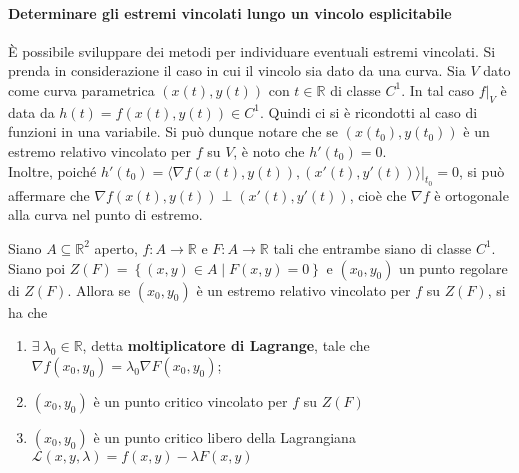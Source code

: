 \paragraph{Determinare gli estremi vincolati lungo un vincolo esplicitabile}
È possibile sviluppare dei metodi per individuare eventuali estremi vincolati. Si prenda in considerazione il caso in cui il vincolo sia dato da una curva.
Sia $V$ dato come curva parametrica $(x(t), y(t))$ con $t \in \mathbb{R}$ di classe $C^1$.
In tal caso $f \big|_V$ è data da $h(t)=f(x(t), y(t)) \in C^1$. Quindi ci si è ricondotti al caso di funzioni in una variabile. Si può dunque notare che se $(x(t_0), y(t_0))$ è un estremo relativo vincolato per $f$ su $V$, è noto che $h'(t_0)=0$.\\
Inoltre, poiché $h'(t_0)= \langle \nabla f(x(t), y(t)), (x'(t), y'(t)) \rangle \big|_{t_0}=0$, si può affermare che $\nabla f(x(t), y(t)) \perp (x'(t), y'(t))$, cioè che $\nabla f$ è ortogonale alla curva nel punto di estremo.
\begin{theorem} \label{Teo: Moltiplicatore di Lagrange}
Siano $A \subseteq \mathbb{R}^2$ aperto, $f: A \to \mathbb{R}$ e $F: A \to \mathbb{R}$ tali che entrambe siano di classe $C^1$. Siano poi $Z(F)= \left\{ (x,y) \in A \mid F(x,y)=0\right\}$ e $(x_0,y_0)$ un punto regolare di $Z(F)$. Allora se $(x_0, y_0)$ è un estremo relativo vincolato per $f$ su $Z(F)$, si ha che
\begin{enumerate}
    \item  $\exists\ \lambda_0 \in \mathbb{R}$, detta \textbf{moltiplicatore di Lagrange}, tale che $\nabla f(x_0, y_0)= \lambda_0 \nabla F(x_0, y_0)$;
    \item $(x_0, y_0)$ è un punto critico vincolato per $f$ su $Z(F)$
    \item $(x_0, y_0)$ è un punto critico libero della Lagrangiana $\mathcal{L}(x, y, \lambda)=f(x,y)- \lambda F(x, y)$
\end{enumerate}
\end{theorem}
